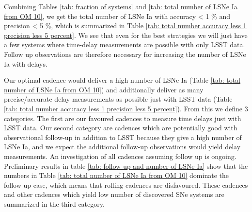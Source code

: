%
Combining Tables \ref{tab: fraction of systems} and \ref{tab: total
  number of LSNe Ia from OM 10}, we get the total number of LSNe Ia
with accuracy < 1 \% and precision < 5 \%, which is summarized in
Table \ref{tab: total number accuracy less 1 precision less 5
  percent}. We see that even for the best strategies we will just have
a few systems where time-delay measurements are possible with only
LSST data. Follow up observations are therefore necessary for
increasing the number of LSNe Ia with delays.

Our optimal cadence would deliver a high number of LSNe Ia (Table
\ref{tab: total number of LSNe Ia from OM 10}) and additionally
deliver as many precise/accurate delay measurements as possible just
with LSST data (Table \ref{tab: total number accuracy less 1 precision
  less 5 percent}). From this we define 3 categories. The first are our
favoured cadences to measure time delays just with LSST data. Our
second category are cadences which are potentially good with
observational follow-up in addition to LSST because they give a high
number of LSNe Ia, and we expect the additional follow-up observations
would yield delay measurements. An investigation of all cadences
assuming follow up is ongoing. Preliminary results in table \ref{tab: follow up and number of LSNe Ia} show that the
numbers in Table \ref{tab: total number of LSNe Ia from OM 10}
dominate the follow up case, which means that rolling cadences are
disfavoured. These cadences and other cadences which yield low number
of discovered SNe systems are summarized in the third category.

